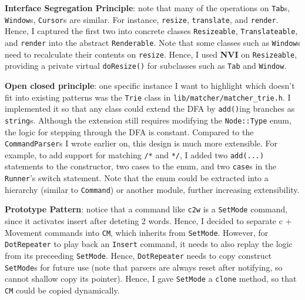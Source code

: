 \documentclass{article}
\begin{document}
\textbf{Interface Segregation Principle}: 
note that many of the operations on \texttt{Tab}s, \texttt{Window}s, \texttt{Cursor}s
are similar. For instance, \texttt{resize}, \texttt{translate}, 
and \texttt{render}. Hence, I captured the first two into concrete classes 
\texttt{Resizeable}, \texttt{Translateable}, and \texttt{render} into 
the abstract \texttt{Renderable}. 
Note that some classes such as \texttt{Window}s need to recalculate 
their contents on \texttt{resize}. Hence, I used \textbf{NVI} on \texttt{Resizeable}, 
providing a private virtual \texttt{doResize()} for subclasses such as 
\texttt{Tab} and \texttt{Window}. 

\textbf{Open closed principle}: one specific instance I want to highlight 
which doesn't fit into existing patterns was the 
\texttt{Trie} class in \texttt{lib/matcher/matcher\_trie.h}. 
I implemented it so that any class could extend the DFA by 
\texttt{add()}ing branches as \texttt{string}s. 
Although the extension still requires modifying the \texttt{Node::Type} enum, 
the logic for stepping through the DFA is constant. 
Compared to the \texttt{CommandParser}s I wrote earlier on, 
this design is much more extensible. 
For example, to add support for matching \texttt{/*} and \texttt{*/}, 
I added two \texttt{add(...)} statements to the constructor, 
two cases to the enum, and two \texttt{case}s in the \texttt{Runner}'s switch statement. 
Note that the enum could be extracted into a hierarchy (similar to \texttt{Command}) 
or another module,
further increasing extensibility. 

\textbf{Prototype Pattern}: notice that a command like \texttt{c2w} 
is a \texttt{SetMode} command, since it activates insert after deteting 2 words. 
Hence, I decided to separate c + Movement commands into \texttt{CM}, 
which inherits from \texttt{SetMode}. 
However, for \texttt{DotRepeater} to play back an \texttt{Insert} command, 
it needs to also replay the logic from its preceeding \texttt{SetMode}. 
Hence, \texttt{DotRepeater} needs to copy construct \texttt{SetMode}s for future use 
(note that parsers are always reset after notifying, so cannot shallow copy its pointer). 
Hence, I gave \texttt{SetMode} a \texttt{clone} method, so that \texttt{CM} 
could be copied dynamically. 
\end{document}

